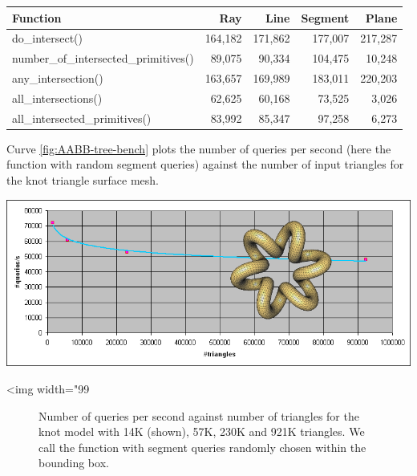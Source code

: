 \begin{tabular}{|l|r|r|r|r|}
  \hline
  Function                              &     Ray &    Line & Segment &   Plane \\
  \hline
  do\_intersect()                       & 164,182 & 171,862 & 177,007 & 217,287 \\
  number\_of\_intersected\_primitives() &  89,075 &  90,334 & 104,475 &  10,248 \\
  any\_intersection()                   & 163,657 & 169,989 & 183,011 & 220,203 \\
  all\_intersections()                  &  62,625 &  60,168 &  73,525 &   3,026 \\
  all\_intersected\_primitives()        &  83,992 &  85,347 &  97,258 &   6,273 \\
  \hline
\end{tabular}

Curve \ref{fig:AABB-tree-bench} plots the number of queries per second (here the  function with random segment queries) against the number of input triangles for the knot triangle surface mesh.

\begin{center}
    \label{fig:AABB-tree-bench}
    \begin{ccTexOnly}
      \includegraphics[width=1.0\textwidth]{AABB_tree/figs/bench}
    \end{ccTexOnly}
    \begin{ccHtmlOnly}
        <img width="99%
    \end{ccHtmlOnly}
    \begin{figure}[h]
        \caption{Number of queries per second against number of triangles
                 for the knot model with 14K (shown), 57K, 230K and 921K
                 triangles. We call the  function
                 with segment queries randomly chosen within
                 the bounding box. }
    \end{figure}
\end{center}

